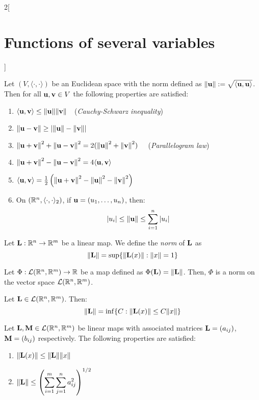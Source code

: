 \documentclass[../../../main_math.tex]{subfiles}
\begin{document}
\begin{multicols}{2}[\section{Functions of several variables}]
\begin{corollary}
  \end{corollary}
  \begin{proposition}
    Let $(V,\langle\cdot,\cdot\rangle)$ be an Euclidean space with the norm defined as $\|\boldsymbol{\mathrm{u}}\|:=\sqrt{\langle \boldsymbol{\mathrm{u}},\boldsymbol{\mathrm{u}}\rangle}$. Then for all $\boldsymbol{\mathrm{u}},\boldsymbol{\mathrm{v}}\in V$ the following properties are satisfied:
    \begin{enumerate}
      \item $\langle \boldsymbol{\mathrm{u}},\boldsymbol{\mathrm{v}}\rangle\leq\|\boldsymbol{\mathrm{u}}\|\|\boldsymbol{\mathrm{v}}\|\quad$(\emph{Cauchy-Schwarz inequality})
      \item $\|\boldsymbol{\mathrm{u}}-\boldsymbol{\mathrm{v}}\|\geq\abs{\|\boldsymbol{\mathrm{u}}\|-\|\boldsymbol{\mathrm{v}}\|}$
      \item ${\|\boldsymbol{\mathrm{u}}+\boldsymbol{\mathrm{v}}\|}^2+{\|\boldsymbol{\mathrm{u}}-\boldsymbol{\mathrm{v}}\|}^2=2({\|\boldsymbol{\mathrm{u}}\|}^2+{\|\boldsymbol{\mathrm{v}}\|}^2)\quad$ (\emph{Parallelogram law})
      \item ${\|\boldsymbol{\mathrm{u}}+\boldsymbol{\mathrm{v}}\|}^2-{\|\boldsymbol{\mathrm{u}}-\boldsymbol{\mathrm{v}}\|}^2=4\langle \boldsymbol{\mathrm{u}},\boldsymbol{\mathrm{v}}\rangle$
      \item $\langle\boldsymbol{\mathrm{u}},\boldsymbol{\mathrm{v}}\rangle=\frac{1}{2}\left({\|\boldsymbol{\mathrm{u}}+\boldsymbol{\mathrm{v}}\|}^2-{\|\boldsymbol{\mathrm{u}}\|}^2-{\|\boldsymbol{\mathrm{v}}\|}^2\right)$
      \item On $(\mathbb{R}^n,\langle\cdot,\cdot\rangle_2)$, if $\boldsymbol{\mathrm{u}}=(u_1,\ldots,u_n)$, then: $$|u_i|\leq\|\boldsymbol{\mathrm{u}}\|\leq\sum_{i=1}^n|u_i|$$
    \end{enumerate}
  \end{proposition}
  \begin{definition}
    Let $\boldsymbol{\mathrm{L}}:\mathbb{R}^n\rightarrow\mathbb{R}^m$ be a linear map. We define the \emph{norm} of $\boldsymbol{\mathrm{L}}$ as $$\|\boldsymbol{\mathrm{L}}\|=\sup\{\|\boldsymbol{\mathrm{L}}(x)\|:\|x\|=1\}$$
  \end{definition}
  \begin{lemma}
    Let $\Phi:\mathcal{L}(\mathbb{R}^n,\mathbb{R}^m)\rightarrow\mathbb{R} $ be a map defined as $\Phi(\boldsymbol{\mathrm{L}})=\|\boldsymbol{\mathrm{L}}\|$. Then, $\Phi$ is a norm on the vector space $\mathcal{L}(\mathbb{R}^n,\mathbb{R}^m)$.
  \end{lemma}
  \begin{proposition}
    Let $\boldsymbol{\mathrm{L}}\in\mathcal{L}(\mathbb{R}^n,\mathbb{R}^m)$. Then: $$\|\boldsymbol{\mathrm{L}}\|=\inf\{C:\|\boldsymbol{\mathrm{L}}(x)\|\leq C\|x\|\}$$
  \end{proposition}
  \begin{corollary}
    Let $\boldsymbol{\mathrm{L}},\boldsymbol{\mathrm{M}}\in\mathcal{L}(\mathbb{R}^n,\mathbb{R}^m)$ be linear maps with associated matrices $\boldsymbol{\mathrm{L}}=(a_{ij})$, $\boldsymbol{\mathrm{M}}=(b_{ij})$ respectively. The following properties are satisfied:
    \begin{enumerate}
      \item $\|\boldsymbol{\mathrm{L}}(x)\|\leq\|\boldsymbol{\mathrm{L}}\|\|x\|$
      \item $\displaystyle\|\boldsymbol{\mathrm{L}}\|\leq{\left(\sum_{i=1}^m\sum_{j=1}^na_{ij}^2\right)}^{1/2}$

\end{enumerate}
\end{corollary}
\end{multicols}
\end{document}
